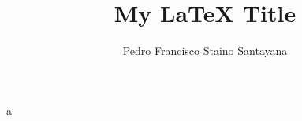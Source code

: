 \documentclass[12pt]{article}
\title{My LaTeX Title}
\author{Pedro Francisco Staino Santayana}
\date{}
\begin{document}
\maketitle

a
\end{document}
